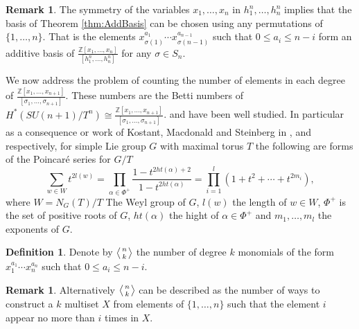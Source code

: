 \documentclass{article}
\theoremstyle{plain}
\theoremstyle{definition}
\newtheorem{defn}[thm]{Definition}
\newtheorem{rmk}[thm]{Remark}
\numberwithin{thm}{section}
\begin{document}
			\begin{rmk}\label{rmk:AddBasis}
				The symmetry of the variables $x_1,\dots,x_n$ in $h_1^n,\dots,h_n^n$ implies that the basis of Theorem \ref{thm:AddBasis}
				can be chosen using any permutations of $\{ 1,\dots,n \}$.
				That is the elements $x_{\sigma(1)}^{a_1}\cdots x_{\sigma(n-1)}^{a_{n-1}}$ such that $0\leq a_i \leq n-i$ form an additive basis of
				$\frac{\mathbb{Z}[x_1,\dots,x_n]}{[h_1^n,\dots,h_n^n]}$ for any $\sigma\in S_n$.
			\end{rmk}
			
			We now address the problem of counting the number of elements in each degree of $\frac{\mathbb{Z}[x_1,\dots,x_{n+1}]}{[\sigma_1,\dots,\sigma_{n+1}]}$.
			These numbers are the Betti numbers of $H^*(SU(n+1)/T^n)\cong \frac{\mathbb{Z}[x_1,\dots,x_{n+1}]}{[\sigma_1,\dots,\sigma_{n+1}]}$.
			and have been well studied.  
			In particular as a consequence or work of Kostant, Macdonald and Steinberg in 
			\cite{Kostant2009}, \cite{Macdonald1972} and \cite{FiniteReflectionGroups} respectively,
			for simple Lie group $G$ with maximal torus $T$ the following are forms of the Poincar{\'e} series for $G/T$
			\begin{equation*}
				\sum_{w\in W}{t^{2l(w)}}=\prod_{\alpha \in \Phi^{+}}{\frac{1-t^{2ht(\alpha)+2}}{1-t^{2ht(\alpha)}}}=\prod_{i=1}^{l}(1+t^2+\cdots+t^{2m_i}),
			\end{equation*}
			where $W=N_G(T)/T$ The Weyl group of $G$,
			$l(w)$ the length of $w\in W$, $\Phi^+$ is the set of positive roots of $G$,
			$ht(\alpha)$ the hight of $\alpha \in \Phi^{+}$
			and $m_1,\dots,m_l$ the exponents of $G$.
			
			\begin{defn}\label{def:tri}
				Denote by ${\ensuremath{\left \langle \genfrac{}{}{0pt}{}{{n}}{{k}}\right \rangle}}$ the number of degree $k$ monomials of the form $x_1^{a_1}\cdots x_{n}^{a_{n}}$ such that $0\leq a_i \leq n-i$.
			\end{defn}
			
			\begin{rmk}\label{rmk:tribox}
				Alternatively ${\ensuremath{\left \langle \genfrac{}{}{0pt}{}{{n}}{{k}}\right \rangle}}$ can be described as the number of ways to construct a $k$ multiset $X$ from elements of $\{1,\dots,n\}$
				such that the element $i$ appear no more than $i$ times in $X$.
			\end{rmk}
			
\end{document}
